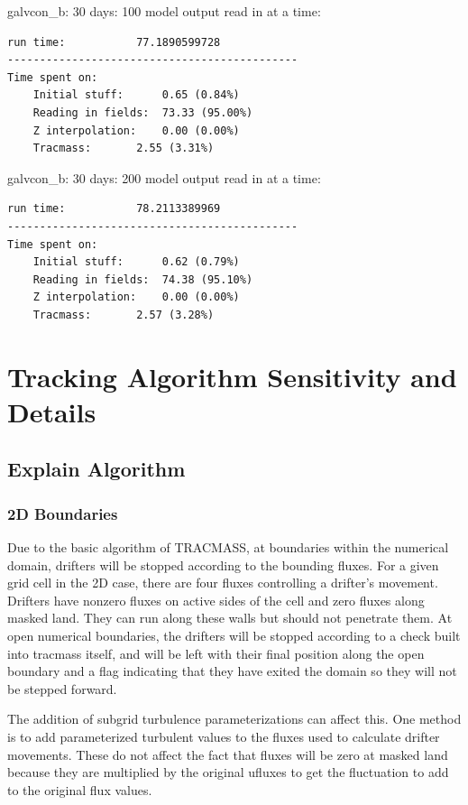 \documentclass[11pt]{article}
\begin{document}
galvcon_b: 30 days: 100 model output read in at a time: \\
\begin{verbatim}
run time:           77.1890599728
---------------------------------------------
Time spent on:
    Initial stuff:      0.65 (0.84%)
    Reading in fields:  73.33 (95.00%)
    Z interpolation:    0.00 (0.00%)
    Tracmass:       2.55 (3.31%)
\end{verbatim}

galvcon_b: 30 days: 200 model output read in at a time: \\
\begin{verbatim}
run time:           78.2113389969
---------------------------------------------
Time spent on:
    Initial stuff:      0.62 (0.79%)
    Reading in fields:  74.38 (95.10%)
    Z interpolation:    0.00 (0.00%)
    Tracmass:       2.57 (3.28%)
\end{verbatim}

\section{Tracking Algorithm Sensitivity and Details}

\subsection{Explain Algorithm}

\subsubsection{2D Boundaries}

Due to the basic algorithm of TRACMASS, at boundaries within the numerical domain, drifters will be stopped according to the bounding fluxes. For a given grid cell in the 2D case, there are four fluxes controlling a drifter's movement. Drifters have nonzero fluxes on active sides of the cell and zero fluxes along masked land. They can run along these walls but should not penetrate them. At open numerical boundaries, the drifters will be stopped according to a check built into tracmass itself, and will be left with their final position along the open boundary and a flag indicating that they have exited the domain so they will not be stepped forward.

The addition of subgrid turbulence parameterizations can affect this. One method is to add parameterized turbulent values to the fluxes used to calculate drifter movements. These do not affect the fact that fluxes will be zero at masked land because they are multiplied by the original ufluxes to get the fluctuation to add to the original flux values.
\end{document}
